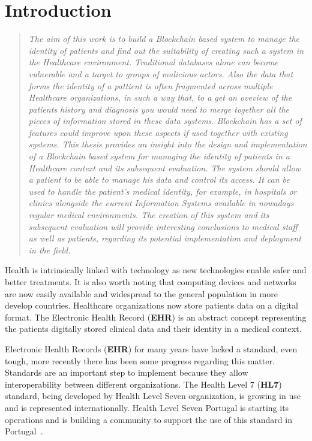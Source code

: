 \chapter{Introduction}\label{introduction}

\begin{quote} 
  \emph{The aim of this work is to build a Blockchain based system to manage
  the identity of patients and find out the suitability of creating such a
  system in the Healthcare environment.  Traditional databases alone can become
  vulnerable and a target to groups of malicious actors. Also the data that
  forms the identity of a pattient is often fragmented across multiple
  Healthcare organizations, in such a way that, to a get an oveview of the
  patients history and diagnosis you would need to merge together all the
  pieces of information stored in these data systems. Blockchain has a set of
  features could improve upon these aspects if used together with existing
  systems. This thesis provides an insight into the design and implementation
  of a Blockchain based system for managing the identity of patients in a
  Healthcare context and its subsequent evaluation.  The system should allow a
  patient to be able to manage his data and control its access.  It can be used
  to handle the patient’s medical identity, for example, in hospitals or
  clinics alongside the current Information Systems available in nowadays
  regular medical environments. The creation of this system and its subsequent
  evaluation will provide interesting conclusions to medical staff as well as
  patients, regarding its potential implementation and deployment in the
  field.} 
\end{quote}

Health is intrinsically linked with technology as new technologies enable safer
and better treatments. It is also worth noting that computing devices and
networks are now easily available and widespread to the general population in
more develop countries. Healthcare organizations now store patients data on a
digital format. The Electronic Health Record (\textbf{EHR}) is an abstract
concept representing the patients digitally stored clinical data and their
identity in a medical context.

Electronic Health Records (\textbf{EHR}) for many years have lacked a standard,
even tough, more recently there has been some progress regarding this matter.
Standards are an important step to implement because they allow
interoperability between different organizations. The Health Level 7
(\textbf{HL7}) standard, being developed by Health Level Seven organization, is
growing in use and is represented internationally. Health Level Seven Portugal
is starting its operations and is building a community to support the use of
this standard in Portugal~\cite{HealthLevel7}.

